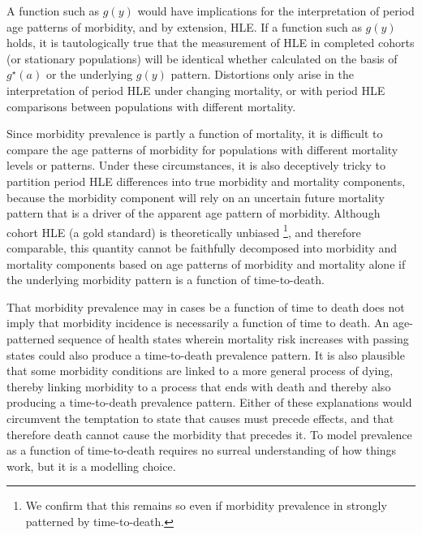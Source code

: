 \documentclass[11pt,oneside,a4paper]{article} %
\begin{document}
A function such as $g(y)$ would have implications for the interpretation of
period age patterns of morbidity, and by extension, HLE. If a function such as $g(y)$ holds, it is tautologically true that the
measurement of HLE in completed cohorts (or stationary populations)
will be identical whether calculated on the basis of $g^\star(a)$ or the
underlying $g(y)$ pattern. Distortions only arise in the interpretation of
period HLE under changing mortality, or with period HLE comparisons between
populations with different mortality. 


Since morbidity prevalence is partly a function of mortality, it is
difficult to compare the age patterns of morbidity for populations with different mortality
levels or patterns. Under these circumstances, it is also deceptively tricky to
partition period HLE differences into true morbidity and mortality
components, because the morbidity component will rely on an uncertain future
mortality pattern that is a driver of the apparent age pattern of morbidity. Although cohort HLE (a gold standard) is theoretically unbiased \citep{imai2007estimation}\footnote{We
confirm that this remains so even if morbidity prevalence in strongly patterned
by time-to-death.}, and therefore comparable, this quantity cannot be faithfully
decomposed into morbidity and mortality components based on age patterns of morbidity and mortality alone if
the underlying morbidity pattern is a function of time-to-death.

That morbidity prevalence may in cases be a function of time to death does not
imply that morbidity incidence is necessarily a function of time to death. An
age-patterned sequence of health states wherein mortality risk increases with
passing states could also produce a time-to-death prevalence pattern. It is also
plausible that some morbidity conditions are linked to a more general process of
dying, thereby linking morbidity to a process that ends with death and
thereby also producing a time-to-death prevalence pattern. Either of
these explanations would circumvent the temptation to state that causes must
precede effects, and that therefore death cannot cause the morbidity that
precedes it. To model prevalence as a function of time-to-death requires no
surreal understanding of how things work, but it is a modelling choice.
 
\end{document}
